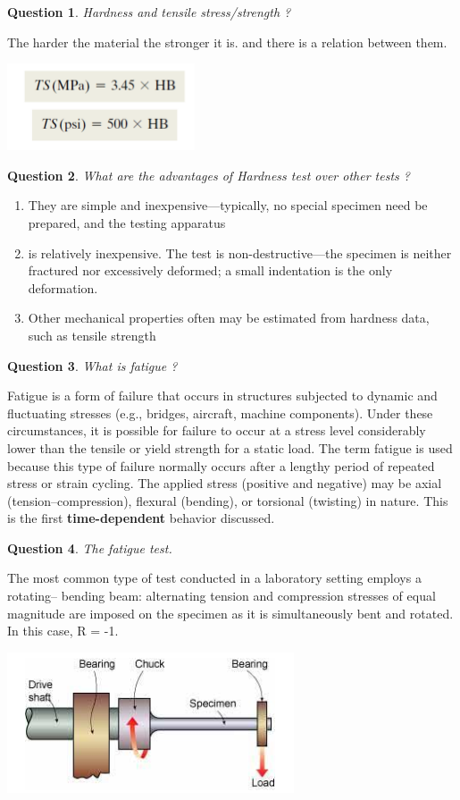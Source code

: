 \documentclass[13]{article}
\newtheorem{exer}{Question}
\begin{document}
\begin{exer}
Hardness and tensile stress/strength ?
\end{exer}
The harder the material the stronger it is. and there is a relation between them. 
\begin{center}
\includegraphics[scale=0.5]{figures/34.png}
\end{center}
\begin{exer}
What are the advantages of Hardness test over other tests ?
\end{exer}
\begin{enumerate}
\item They are simple and inexpensive—typically, no special specimen need be prepared, and the testing apparatus
\item is relatively inexpensive.
The test is non-destructive—the specimen is neither fractured nor excessively deformed; a small indentation is the only deformation.
\item Other mechanical properties often may be estimated from hardness data, such as tensile strength
\end{enumerate}
\begin{exer}
What is fatigue ?
\end{exer}
Fatigue is a form of failure that occurs in structures subjected to dynamic
and fluctuating stresses (e.g., bridges, aircraft, machine components). Under
these circumstances, it is possible for failure to occur at a stress level
considerably lower than the tensile or yield strength for a static load. The
term fatigue is used because this type of failure normally occurs after a
lengthy period of repeated stress or strain cycling. The applied stress
(positive and negative)  may be axial (tension–compression), flexural
(bending), or torsional (twisting) in nature. This is the first
\textbf{time-dependent}  behavior discussed.
\begin{exer}
The fatigue test.
\end{exer}
The most common type of test conducted in a laboratory setting employs a
rotating– bending beam: alternating tension and compression stresses of equal
magnitude are imposed on the specimen as it is simultaneously bent and
rotated. In this case, R = -1.
\begin{center}
\includegraphics[scale=0.5]{figures/37.png}
\end{center}
\end{document}
